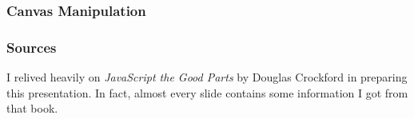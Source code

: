 \documentclass{lug}
\begin{document}
\begin{frame}
    \frametitle{Canvas Manipulation}

\end{frame}

\begin{frame}
    \frametitle{Sources}

    I relived heavily on \textit{JavaScript the Good Parts} by Douglas Crockford in preparing this
    presentation. In fact, almost every slide contains some information I got from that book.
\end{frame}
\end{document}
